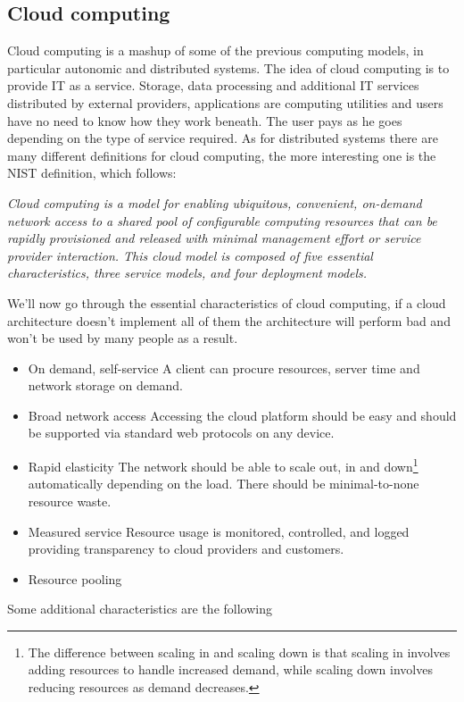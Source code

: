 \subsection{Cloud computing}
Cloud computing is a mashup of some of the previous computing models, in particular autonomic and distributed systems. \n
The idea of cloud computing is to provide IT as a service. Storage, data processing and additional IT services distributed by external providers, applications are computing utilities and users have no need to know how they work beneath. The user pays as he goes depending on the type of service required. \n
As for distributed systems there are many different definitions for cloud computing, the more interesting one is the NIST definition, which follows:
\begin{center}
    \textit{Cloud computing is a model for enabling ubiquitous, convenient, on-demand network access to a shared pool of configurable computing resources that can be rapidly provisioned and released with minimal management effort or service provider interaction. This cloud model is composed of five essential characteristics, three service models, and four deployment models.}
\end{center}
We'll now go through the essential characteristics of cloud computing, if a cloud architecture doesn't implement all of them the architecture will perform bad and won't be used by many people as a result.
\begin{itemize}
    \item On demand, self-service \n
    A client can procure resources, server time and network storage on demand.
    \item Broad network access \n
    Accessing the cloud platform should be easy and should be supported via standard web protocols on any device.
    \item Rapid elasticity \n
    The network should be able to scale out, in and down\footnote{
        The difference between scaling in and scaling down is that scaling in involves adding resources to handle increased demand, while scaling down involves reducing resources as demand decreases.
    } automatically depending on the load. There should be minimal-to-none resource waste.
    \item Measured service \n
    Resource usage is monitored, controlled, and logged providing transparency to cloud providers and customers.
    \item Resource pooling
\end{itemize}
Some additional characteristics are the following
